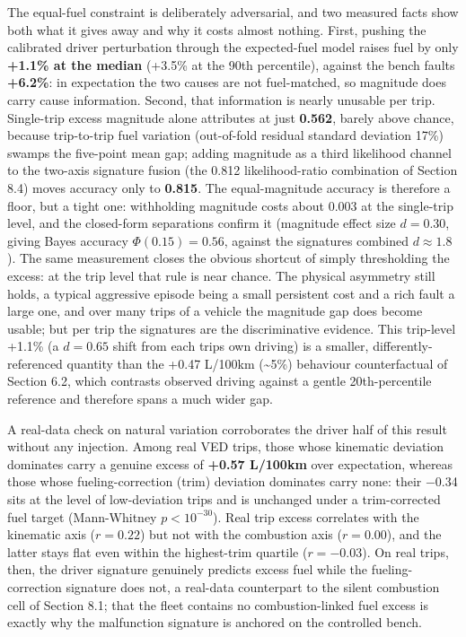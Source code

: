 The equal-fuel constraint is deliberately adversarial, and two measured
facts show both what it gives away and why it costs almost nothing.
First, pushing the calibrated driver perturbation through the
expected-fuel model raises fuel by only \textbf{+1.1\% at the median}
(+3.5\% at the 90th percentile), against the bench
fault\textquotesingle s \textbf{+6.2\%}: in expectation the two causes
are not fuel-matched, so magnitude does carry cause information. Second,
that information is nearly unusable per trip. Single-trip excess
magnitude alone attributes at just \textbf{0.562}, barely above chance,
because trip-to-trip fuel variation (out-of-fold residual standard
deviation 17\%) swamps the five-point mean gap; adding magnitude as a
third likelihood channel to the two-axis signature fusion (the 0.812
likelihood-ratio combination of Section 8.4) moves accuracy only to
\textbf{0.815}. The equal-magnitude accuracy is therefore a floor, but a
tight one: withholding magnitude costs about 0.003 at the single-trip
level, and the closed-form separations confirm it (magnitude effect size
\(d = 0.30\), giving Bayes accuracy \(\Phi(0.15) = 0.56\), against the
signatures\textquotesingle{} combined \(d \approx 1.8\)). The same
measurement closes the obvious shortcut of simply thresholding the
excess: at the trip level that rule is near chance. The physical
asymmetry still holds, a typical aggressive episode being a small
persistent cost and a rich fault a large one, and over many trips of a
vehicle the magnitude gap does become usable; but per trip the
signatures are the discriminative evidence. This trip-level +1.1\% (a
\(d = 0.65\) shift from each trip\textquotesingle s own driving) is a
smaller, differently-referenced quantity than the +0.47 L/100km
(\textasciitilde5\%) behaviour counterfactual of Section 6.2, which
contrasts observed driving against a gentle 20th-percentile reference
and therefore spans a much wider gap.

A real-data check on natural variation corroborates the driver half of
this result without any injection. Among real VED trips, those whose
kinematic deviation dominates carry a genuine excess of \textbf{+0.57
L/100km} over expectation, whereas those whose fueling-correction (trim)
deviation dominates carry none: their −0.34 sits at the level of
low-deviation trips and is unchanged under a trim-corrected fuel target
(Mann-Whitney \(p<10^{-30}\)). Real trip excess correlates with the
kinematic axis (\(r = 0.22\)) but not with the combustion axis
(\(r = 0.00\)), and the latter stays flat even within the highest-trim
quartile (\(r = -0.03\)). On real trips, then, the driver signature
genuinely predicts excess fuel while the fueling-correction signature
does not, a real-data counterpart to the silent combustion cell of
Section 8.1; that the fleet contains no combustion-linked fuel excess is
exactly why the malfunction signature is anchored on the controlled
bench.

